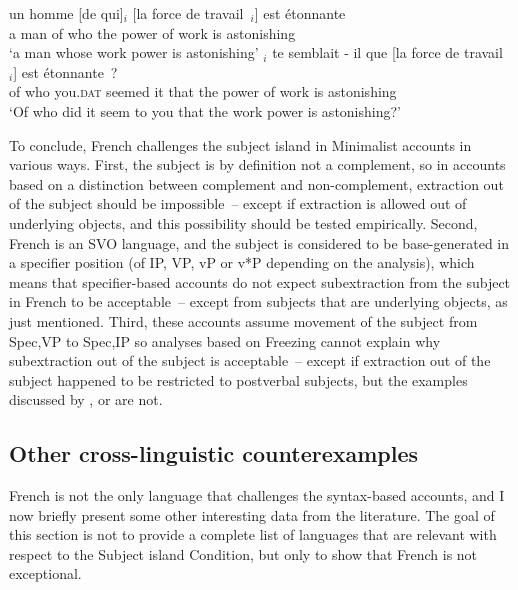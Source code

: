 \begin{exe}
\ex \citep[56]{Godard.1988}
\begin{xlist}
\ex \gll un homme [de qui]$_i$ [la force de travail~\trace{}$_i$] est étonnante\\
a man of who the power of work is astonishing\\
\glt `a man whose work power is astonishing'
\ex \gll [De qui]$_i$ te semblait - il que [la force de travail~\trace{}$_i$] est étonnante~?\\
of who you\textsc{.dat} seemed {} it that the power of work is astonishing\\
\glt `Of who did it seem to you that the work power is astonishing?'
\end{xlist}
\end{exe}
\largerpage


To conclude, French challenges the subject island in Minimalist accounts in various ways. First, the subject is by definition not a complement, so in accounts based on a distinction between complement and non-complement, extraction out of the subject should be impossible~-- except if extraction is allowed out of underlying objects, and this possibility should be tested empirically. Second, French is an SVO language, and the subject is considered to be base-generated in a specifier position (of IP, VP, vP or v*P depending on the analysis), which means that specifier-based accounts do not expect subextraction from the subject in French to be acceptable~-- except from subjects that are underlying objects, as just mentioned. Third, these accounts assume movement of the subject from Spec,VP to Spec,IP so analyses based on Freezing cannot explain why subextraction out of the subject is acceptable~-- except if extraction out of the subject happened to be restricted to postverbal subjects, but the examples discussed by \citet{Godard.1988}, \citet{Tellier.1990,Tellier.1991} or \citet{Heck.2009} are not.



\subsection{Other cross-linguistic counterexamples}\largerpage

French is not the only language that challenges the syntax-based accounts, and I now briefly present some other interesting data from the literature. The goal of this section is not to provide a complete list of languages that are relevant with respect to the Subject island Condition, but only to show that French is not exceptional.

